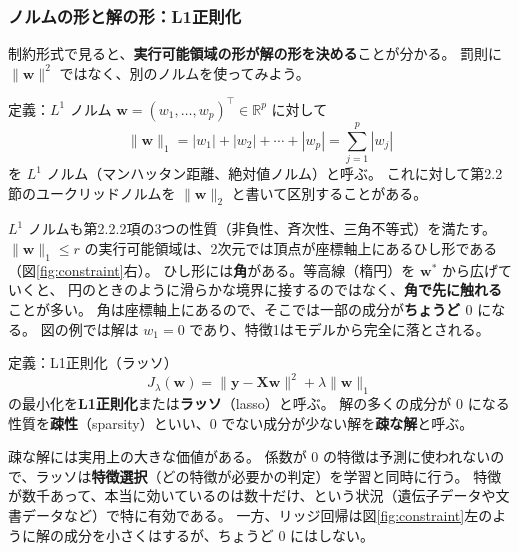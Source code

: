 \subsubsection{ノルムの形と解の形：L1正則化}

制約形式で見ると、\textbf{実行可能領域の形が解の形を決める}ことが分かる。
罰則に $\|\bm{w}\|^2$ ではなく、別のノルムを使ってみよう。

\begin{itembox}[l]{定義：$L^1$ ノルム}
$\bm{w} = (w_1, \ldots, w_p)^\top \in \mathbb{R}^p$ に対して
\begin{equation}
  \|\bm{w}\|_1 = |w_1| + |w_2| + \cdots + |w_p| = \sum_{j=1}^{p} |w_j|
\end{equation}
を $L^1$ ノルム（マンハッタン距離、絶対値ノルム）と呼ぶ。
これに対して第2.2節のユークリッドノルムを $\|\bm{w}\|_2$ と書いて区別することがある。
\end{itembox}

$L^1$ ノルムも第2.2.2項の3つの性質（非負性、斉次性、三角不等式）を満たす。
$\|\bm{w}\|_1 \leq r$ の実行可能領域は、2次元では頂点が座標軸上にあるひし形である（図\ref{fig:constraint}右）。
ひし形には\textbf{角}がある。等高線（楕円）を $\bm{w}^*$ から広げていくと、
円のときのように滑らかな境界に接するのではなく、\textbf{角で先に触れる}ことが多い。
角は座標軸上にあるので、そこでは一部の成分が\textbf{ちょうど $0$} になる。
図の例では解は $w_1 = 0$ であり、特徴1はモデルから完全に落とされる。

\begin{itembox}[l]{定義：L1正則化（ラッソ）}
\begin{equation}
  J_\lambda(\bm{w}) = \|\bm{y} - \bm{X}\bm{w}\|^2 + \lambda\|\bm{w}\|_1
  \label{eq:lasso}
\end{equation}
の最小化を\textbf{L1正則化}または\textbf{ラッソ}（lasso）と呼ぶ。
解の多くの成分が $0$ になる性質を\textbf{疎性}（sparsity）といい、$0$ でない成分が少ない解を\textbf{疎な解}と呼ぶ。
\end{itembox}

疎な解には実用上の大きな価値がある。
係数が $0$ の特徴は予測に使われないので、ラッソは\textbf{特徴選択}（どの特徴が必要かの判定）を学習と同時に行う。
特徴が数千あって、本当に効いているのは数十だけ、という状況（遺伝子データや文書データなど）で特に有効である。
一方、リッジ回帰は図\ref{fig:constraint}左のように解の成分を小さくはするが、ちょうど $0$ にはしない。


